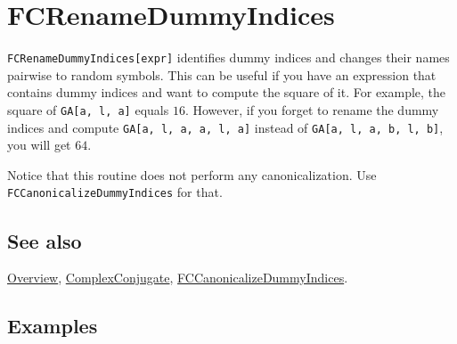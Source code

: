 \documentclass[../FeynCalcManual.tex]{subfiles}
\begin{document}
\hypertarget{fcrenamedummyindices}{%
\section{FCRenameDummyIndices}\label{fcrenamedummyindices}}

\texttt{FCRenameDummyIndices[\allowbreak{}expr]} identifies dummy
indices and changes their names pairwise to random symbols. This can be
useful if you have an expression that contains dummy indices and want to
compute the square of it. For example, the square of
\texttt{GA[\allowbreak{}a,\ \allowbreak{}l,\ \allowbreak{}a]} equals
\(16\). However, if you forget to rename the dummy indices and compute
\texttt{GA[\allowbreak{}a,\ \allowbreak{}l,\ \allowbreak{}a,\ \allowbreak{}a,\ \allowbreak{}l,\ \allowbreak{}a]}
instead of
\texttt{GA[\allowbreak{}a,\ \allowbreak{}l,\ \allowbreak{}a,\ \allowbreak{}b,\ \allowbreak{}l,\ \allowbreak{}b]},
you will get \(64\).

Notice that this routine does not perform any canonicalization. Use
\texttt{FCCanonicalizeDummyIndices} for that.

\subsection{See also}

\hyperlink{toc}{Overview},
\hyperlink{complexconjugate}{ComplexConjugate},
\hyperlink{fccanonicalizedummyindices}{FCCanonicalizeDummyIndices}.

\subsection{Examples}

\begin{Shaded}
\begin{Highlighting}[]
\OperatorTok{[}\OperatorTok{,}\OperatorTok{]}\OperatorTok{[}\OperatorTok{,}\OperatorTok{]} \SpecialCharTok{+}\OperatorTok{[}\OperatorTok{,}\OperatorTok{]}\OperatorTok{[}\OperatorTok{,}\OperatorTok{]} \SpecialCharTok{+}\OperatorTok{[}\OperatorTok{,}\OperatorTok{]}\OperatorTok{[}\OperatorTok{,}\OperatorTok{]} 
 
\OperatorTok{[}\SpecialCharTok{\%}\OperatorTok{]} \SpecialCharTok{//}
\end{Highlighting}
\end{Shaded}
\end{document}
